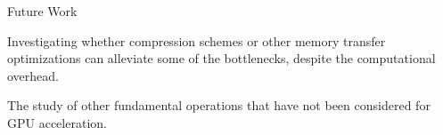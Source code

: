\documentclass[final]{beamer}
\newlength{\sepwidth}
\newlength{\colwidth}
\newcommand{\separatorcolumn}{\begin{column}{\sepwidth}\end{column}}
\begin{document}
\begin{frame}[t]
\begin{columns}[t]
\begin{column}{\colwidth}
\begin{block}{Future Work}

\begin{description}[font=$\bullet$~\normalfont\scshape\color{red!50!black}]
\item Investigating whether compression schemes or other memory transfer optimizations can alleviate some of the bottlenecks, despite the computational overhead.
\item The study of other fundamental operations that have not been considered for GPU acceleration.
\end{description}

\end{block}


\end{column}

\separatorcolumn
\end{columns}
\end{frame}
\end{document}
